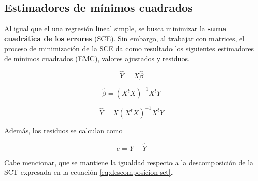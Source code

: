 \documentclass[
  11pt,
]{book}
\theoremstyle{definition}
\theoremstyle{definition}
\theoremstyle{definition}
\theoremstyle{definition}
\theoremstyle{remark}
\begin{document}
\subsection{Estimadores de mínimos cuadrados}\label{EMC-RLM-CUERPO}

Al igual que el una regresión lineal simple, se busca minimizar la \textbf{suma cuadrática de los errores} (SCE). Sin embargo, al trabajar con matrices, el proceso de minimización de la SCE da como resultado los siguientes estimadores de mínimos cuadrados (EMC), valores ajustados y residuos.

\begin{equation}
\widehat{Y} = X\widehat{\beta}
\label{eq:ecuacionajustadamultiple}
\end{equation}

\begin{equation}
\widehat{\beta} = (X^tX)^{-1}X^tY
\label{eq:betasestimadosmultiple}
\end{equation}

\begin{equation}
\widehat{Y} = X(X^tX)^{-1}X^tY
\label{eq:ygorromultiple}
\end{equation}

Además, los residuos se calculan como

\begin{equation}
e = Y - \widehat{Y}
\label{eq:residuosmultiple}
\end{equation}

Cabe mencionar, que se mantiene la igualdad respecto a la descomposición de la SCT expresada en la ecuación \eqref{eq:descomposicion-sct}.
\end{document}
